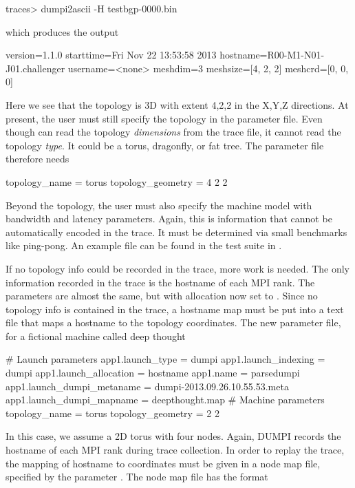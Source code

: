 \begin{ShellCmd}
traces> dumpi2ascii -H testbgp-0000.bin 
\end{ShellCmd}
which produces the output

\begin{ViFile}
version=1.1.0
starttime=Fri Nov 22 13:53:58 2013
hostname=R00-M1-N01-J01.challenger
username=<none>
meshdim=3
meshsize=[4, 2, 2]
meshcrd=[0, 0, 0]
\end{ViFile}
Here we see that the topology is 3D with extent 4,2,2 in the X,Y,Z directions.
At present, the user must still specify the topology in the parameter file.
Even though \sstmacro can read the topology \emph{dimensions} from the trace file,
it cannot read the topology \emph{type}.  It could be a torus, dragonfly, or fat tree.
The parameter file therefore needs

\begin{ViFile}
topology_name = torus
topology_geometry = 4 2 2
\end{ViFile}
Beyond the topology, the user must also specify the machine model with bandwidth and latency parameters.
Again, this is information that cannot be automatically encoded in the trace.
It must be determined via small benchmarks like ping-pong.
An example file can be found in the test suite in .

If no topology info could be recorded in the trace, more work is needed.
The only information recorded in the trace is the hostname of each MPI rank.
The parameters are almost the same, but with allocation now set to .
Since no topology info is contained in the trace, 
a hostname map must be put into a text file that maps a hostname to the topology coordinates.
The new parameter file, for a fictional machine called deep thought

\begin{ViFile}
# Launch parameters
app1.launch_type = dumpi
app1.launch_indexing = dumpi
app1.launch_allocation = hostname
app1.name = parsedumpi
app1.launch_dumpi_metaname = dumpi-2013.09.26.10.55.53.meta
app1.launch_dumpi_mapname = deepthought.map
# Machine parameters
topology_name = torus
topology_geometry = 2 2
\end{ViFile}


In this case, we assume a 2D torus with four nodes.
Again, DUMPI records the hostname of each MPI rank during trace collection.
In order to replay the trace, the mapping of hostname to coordinates must be given in a node map file,
specified by the parameter .
The node map file has the format

